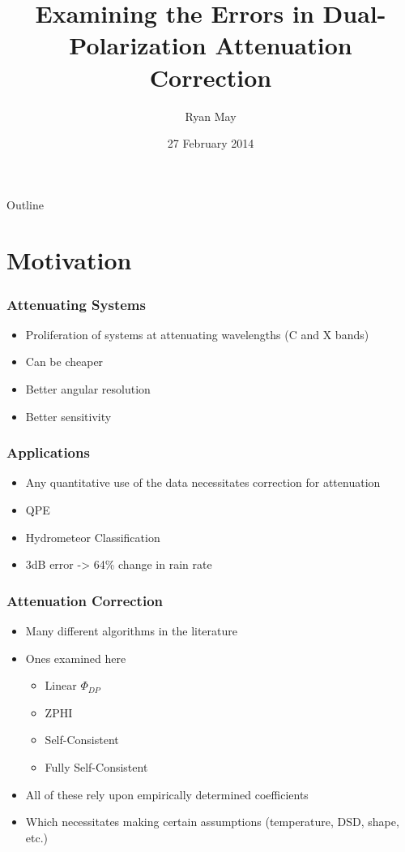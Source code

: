 \documentclass[red]{beamer}
\title{Examining the Errors in Dual-Polarization Attenuation Correction}
\author{Ryan May}
\date{27 February 2014}
\begin{document}
\begin{frame}
\titlepage
\end{frame}

\section[Outline]{}
\begin{frame}{Outline}
    \tableofcontents
\end{frame}

\section{Motivation}
\begin{frame}
	\frametitle{Attenuating Systems}
	\begin{itemize}
		\item Proliferation of systems at attenuating wavelengths (C and X bands)
		\item Can be cheaper
		\item Better angular resolution
		\item Better sensitivity
	\end{itemize}
\end{frame}

\begin{frame}
	\frametitle{Applications}
	\begin{itemize}
		\item Any quantitative use of the data necessitates correction for attenuation
		\item QPE
		\item Hydrometeor Classification
		\item 3dB error -> 64\% change in rain rate
	\end{itemize}
\end{frame}

\begin{frame}
	\frametitle{Attenuation Correction}
	\begin{itemize}
		\item Many different algorithms in the literature
		\item Ones examined here
		\begin{itemize}
			\item Linear $\Phi_{DP}$
			\item ZPHI
			\item Self-Consistent
			\item Fully Self-Consistent
		\end{itemize}
		\item All of these rely upon empirically determined coefficients
		\item Which necessitates making certain assumptions (temperature,
		DSD, shape, etc.)
	\end{itemize}
\end{frame}
\end{document}
